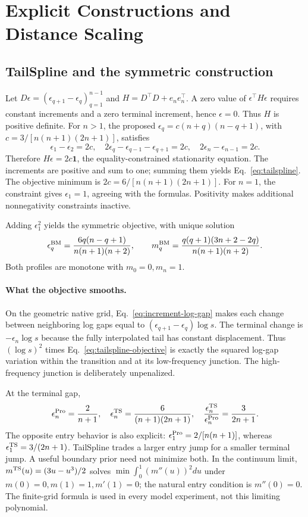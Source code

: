 \section{Explicit Constructions and Distance Scaling}
\label{sec:compact-constructions}\label{sec:allocation-response}
\subsection{TailSpline and the symmetric construction}\label{sec:tailspline-details}\label{sec:bm-construction}
Let $D\epsilon=(\epsilon_{q+1}-\epsilon_q)_{q=1}^{n-1}$ and $H=D^\top D+e_ne_n^\top$. A zero value of $\epsilon^\top H\epsilon$ requires constant increments and a zero terminal increment, hence $\epsilon=0$. Thus $H$ is positive definite. For $n>1$, the proposed $\epsilon_q=c(n+q)(n-q+1)$, with $c=3/[n(n+1)(2n+1)]$, satisfies
\[
\epsilon_1-\epsilon_2=2c,\quad
2\epsilon_q-\epsilon_{q-1}-\epsilon_{q+1}=2c,\quad
2\epsilon_n-\epsilon_{n-1}=2c.
\]
Therefore $H\epsilon=2c\mathbf1$, the equality-constrained stationarity equation. The increments are positive and sum to one; summing them yields Eq.~\eqref{eq:tailspline}. The objective minimum is $2c=6/[n(n+1)(2n+1)]$. For $n=1$, the constraint gives $\epsilon_1=1$, agreeing with the formulas. Positivity makes additional nonnegativity constraints inactive.

Adding $\epsilon_1^2$ yields the symmetric objective, with unique solution
\begin{equation}
\epsilon_q^{\rm BM}=\frac{6q(n-q+1)}{n(n+1)(n+2)},\qquad
m_q^{\rm BM}=\frac{q(q+1)(3n+2-2q)}{n(n+1)(n+2)}.
\label{eq:bm-formula}
\end{equation}
Both profiles are monotone with $m_0=0,m_n=1$.

\paragraph{What the objective smooths.}
On the geometric native grid, Eq.~\eqref{eq:increment-log-gap} makes each change between neighboring log gaps equal to $(\epsilon_{q+1}-\epsilon_q)\log s$. The terminal change is $-\epsilon_n\log s$ because the fully interpolated tail has constant displacement. Thus $(\log s)^2$ times Eq.~\eqref{eq:tailspline-objective} is exactly the squared log-gap variation within the transition and at its low-frequency junction. The high-frequency junction is deliberately unpenalized.

At the terminal gap,
\[
\epsilon_n^{\rm Pro}=\frac2{n+1},\quad
\epsilon_n^{\rm TS}=\frac6{(n+1)(2n+1)},\quad
\frac{\epsilon_n^{\rm TS}}{\epsilon_n^{\rm Pro}}=\frac3{2n+1}.
\]
The opposite entry behavior is also explicit: $\epsilon_1^{\rm Pro}=2/[n(n+1)]$, whereas $\epsilon_1^{\rm TS}=3/(2n+1)$. TailSpline trades a larger entry jump for a smaller terminal jump. A useful boundary prior need not minimize both. In the continuum limit, $m^{\rm TS}(u)=(3u-u^3)/2$ solves $\min\int_0^1(m''(u))^2du$ under $m(0)=0,m(1)=1,m'(1)=0$; the natural entry condition is $m''(0)=0$. The finite-grid formula is used in every model experiment, not this limiting polynomial.

